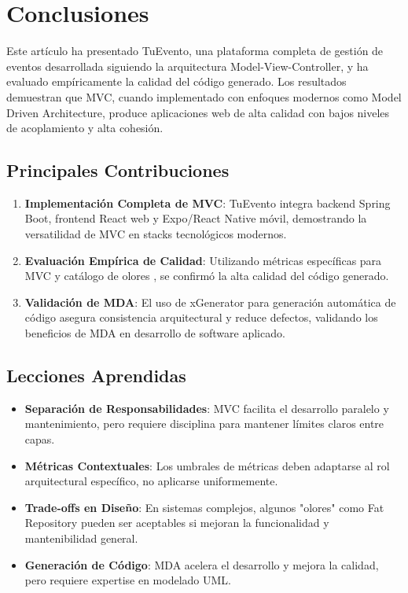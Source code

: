 \section{Conclusiones}

Este artículo ha presentado TuEvento, una plataforma completa de gestión de eventos desarrollada siguiendo la arquitectura Model-View-Controller, y ha evaluado empíricamente la calidad del código generado. Los resultados demuestran que MVC, cuando implementado con enfoques modernos como Model Driven Architecture, produce aplicaciones web de alta calidad con bajos niveles de acoplamiento y alta cohesión.

\subsection{Principales Contribuciones}
\begin{enumerate}
\item \textbf{Implementación Completa de MVC}: TuEvento integra backend Spring Boot, frontend React web y Expo/React Native móvil, demostrando la versatilidad de MVC en stacks tecnológicos modernos.
\item \textbf{Evaluación Empírica de Calidad}: Utilizando métricas específicas para MVC \cite{aniche2016satt} y catálogo de olores \cite{aniche2018code}, se confirmó la alta calidad del código generado.
\item \textbf{Validación de MDA}: El uso de xGenerator para generación automática de código asegura consistencia arquitectural y reduce defectos, validando los beneficios de MDA en desarrollo de software aplicado.
\end{enumerate}

\subsection{Lecciones Aprendidas}
\begin{itemize}
\item \textbf{Separación de Responsabilidades}: MVC facilita el desarrollo paralelo y mantenimiento, pero requiere disciplina para mantener límites claros entre capas.
\item \textbf{Métricas Contextuales}: Los umbrales de métricas deben adaptarse al rol arquitectural específico, no aplicarse uniformemente.
\item \textbf{Trade-offs en Diseño}: En sistemas complejos, algunos "olores" como Fat Repository pueden ser aceptables si mejoran la funcionalidad y mantenibilidad general.
\item \textbf{Generación de Código}: MDA acelera el desarrollo y mejora la calidad, pero requiere expertise en modelado UML.
\end{itemize}

